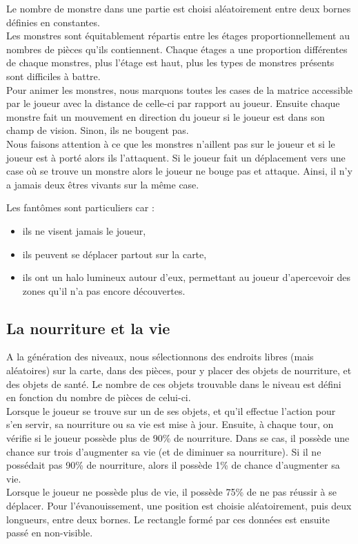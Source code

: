 \documentclass[11pt]{report}
\begin{document}
		Le nombre de monstre dans une partie est choisi aléatoirement entre deux bornes définies en constantes.\\
		Les monstres sont équitablement répartis entre les étages proportionnellement au nombres de pièces qu'ils contiennent. Chaque étages a une proportion différentes de chaque monstres, plus l'étage est haut, plus les types de monstres présents sont difficiles à battre.\\
		Pour animer les monstres, nous marquons toutes les cases de la matrice accessible par le joueur avec la distance de celle-ci par rapport au joueur. Ensuite chaque monstre fait un mouvement en direction du joueur si le joueur est dans son champ de vision. Sinon, ils ne bougent pas.\\
		Nous faisons attention à ce que les monstres n'aillent pas sur le joueur et si le joueur est à porté alors ils l'attaquent. Si le joueur fait un déplacement vers une case où se trouve un monstre alors le joueur ne bouge pas et attaque. Ainsi, il n'y a jamais deux êtres vivants sur la même case.
		
		Les fantômes sont particuliers car :
		\begin{itemize}
			\item ils ne visent jamais le joueur,
			\item ils peuvent se déplacer partout sur la carte,
			\item ils ont un halo lumineux autour d'eux, permettant au joueur d'apercevoir des zones qu'il n'a pas encore découvertes.
		\end{itemize}
		
		\subsection{La nourriture et la vie}
		
		A la génération des niveaux, nous sélectionnons des endroits libres (mais aléatoires) sur la carte, dans des pièces, pour y placer des objets de nourriture, et des objets de santé. Le nombre de ces objets trouvable dans le niveau est défini en fonction du nombre de pièces de celui-ci. \\ Lorsque le joueur se trouve sur un de ses objets, et qu'il effectue l'action pour s'en servir, sa nourriture ou sa vie est mise à jour. Ensuite, à chaque tour, on vérifie si le joueur possède plus de 90\% de nourriture. Dans se cas, il possède une chance sur trois d'augmenter sa vie (et de diminuer sa nourriture). Si il ne possédait pas 90\% de nourriture, alors il possède 1\% de chance d'augmenter sa vie.\\
		Lorsque le joueur ne possède plus de vie, il possède 75\% de ne pas réussir à se déplacer. Pour l'évanouissement, une position est choisie aléatoirement, puis deux longueurs, entre deux bornes. Le rectangle formé par ces données est ensuite passé en non-visible.
		
\end{document}
